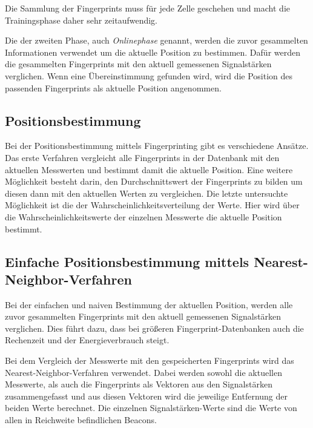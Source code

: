 Die Sammlung der Fingerprints muss für jede Zelle geschehen und macht die Trainingsphase daher sehr zeitaufwendig. 

Die der zweiten Phase, auch \emph{Onlinephase} genannt, werden die zuvor gesammelten Informationen verwendet um die aktuelle Position zu bestimmen. 
Dafür werden die gesammelten Fingerprints mit den aktuell gemessenen Signalstärken verglichen. Wenn eine Übereinstimmung gefunden wird, wird die Position des passenden Fingerprints als aktuelle Position angenommen.


\subsection{Positionsbestimmung}
\label{sec:implementation:fingerprinting:positioning}
Bei der Positionsbestimmung mittels Fingerprinting gibt es verschiedene Ansätze.
Das erste Verfahren vergleicht alle Fingerprints in der Datenbank mit den aktuellen Messwerten und bestimmt damit die aktuelle Position.
Eine weitere Möglichkeit besteht darin, den Durchschnittswert der Fingerprints zu bilden um diesen dann mit den aktuellen Werten zu vergleichen.
Die letzte untersuchte Möglichkeit ist die der Wahrscheinlichkeitsverteilung der Werte. Hier wird über die Wahrscheinlichkeitswerte der einzelnen Messwerte die aktuelle Position bestimmt.

\subsection{Einfache Positionsbestimmung mittels Nearest-Neighbor-Verfahren}
\label{sec:implementation:fingerprinting:positioning:naiv}
Bei der einfachen und naiven Bestimmung der aktuellen Position, werden alle zuvor gesammelten Fingerprints mit den aktuell gemessenen Signalstärken verglichen. Dies führt dazu, dass bei größeren Fingerprint-Datenbanken auch die Rechenzeit und der Energieverbrauch steigt. 

Bei dem Vergleich der Messwerte mit den gespeicherten Fingerprints wird das Nearest-Neighbor-Verfahren verwendet. Dabei werden sowohl die aktuellen Messwerte, als auch die Fingerprints als Vektoren aus den Signalstärken zusammengefasst und aus diesen Vektoren wird die jeweilige Entfernung der beiden Werte berechnet. Die einzelnen Signalstärken-Werte sind die Werte von allen in Reichweite befindlichen Beacons.

